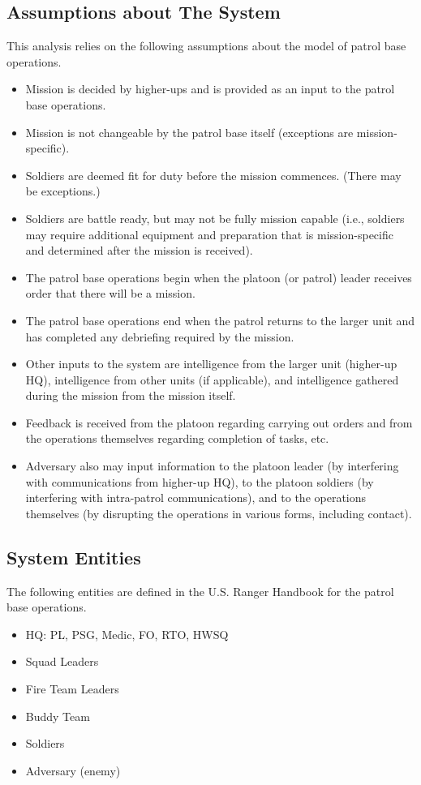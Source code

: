 \documentclass[../../main/main.tex]{subfiles}
\begin{document}
\subsection{Assumptions about The System}
This analysis relies on the following assumptions about the model of patrol base operations.

\begin{itemize}
\item Mission is decided by higher-ups and is provided as an input to the patrol base operations.
\item Mission is not changeable by the patrol base itself (exceptions are mission-specific).
\item Soldiers are deemed fit for duty before the mission commences.   (There may be exceptions.)
\item Soldiers are battle ready, but may not be fully mission capable (i.e., soldiers may require additional equipment and preparation that is mission-specific and determined after the mission is received).
\item The patrol base operations begin when the platoon (or patrol) leader receives order that there will be a mission.
\item The patrol base operations end when the patrol returns to the larger unit and has completed any debriefing required by the mission.
\item Other inputs to the system are intelligence from the larger unit (higher-up HQ), intelligence from other units (if applicable), and intelligence gathered during the mission from the mission itself. 
\item Feedback is received from the platoon regarding carrying out orders and from the operations themselves regarding completion of tasks, etc.  
\item Adversary also may input information to the platoon leader (by interfering with communications from higher-up HQ), to the platoon soldiers (by interfering with intra-patrol communications), and to the operations themselves (by disrupting the operations in various forms, including contact).
\end{itemize}


\subsection{System Entities}
The following entities are defined in the U.S. Ranger Handbook for the patrol base operations.  
\begin{itemize}
\item HQ: PL, PSG, Medic, FO, RTO, HWSQ
\item Squad Leaders
\item Fire Team Leaders
\item Buddy Team
\item Soldiers
\item Adversary (enemy)
\end{itemize}
\end{document}
